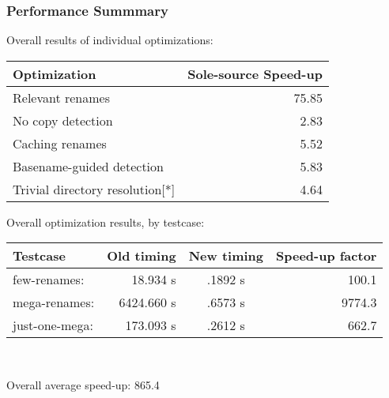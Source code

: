 \documentclass[compress,t]{beamer}
\begin{document}
\begin{frame}
  \frametitle{Performance Summmary}

  \vspace*{-0.2\baselineskip}
  Overall results of individual optimizations:\\
  \pause
  \vspace*{0.4\baselineskip}
  \qquad
  \begin{tabular}{l|r}%
    Optimization
      & \multicolumn{1}{p{5.5em}}{\centering Sole-source Speed-up}
      \\
    \hline
    Relevant renames                & 75.85\hspace*{1.4em}
                                    \\
    No copy detection               &  2.83\hspace*{1.4em}
                                    \\
    Caching renames                 &  5.52\hspace*{1.4em}
                                    \\
    Basename-guided detection       &  5.83\hspace*{1.4em}
                                    \\
    Trivial directory resolution[*] &  4.64\hspace*{1.4em}
  \end{tabular}

  \pause
  \vspace*{0.4\baselineskip}
  Overall optimization results, by testcase:\\
  \vspace*{0.4\baselineskip}
  \qquad
  \begin{tabular}{l|r|c|r}
    Testcase       & \multicolumn{1}{c|}{Old timing}
                   & \multicolumn{1}{c|}{New timing}
                   & \multicolumn{1}{p{4.4em}}{\centering Speed-up factor} \\
    \hline
    few-renames:   &   18.934 s & .1892 s &  100.1 \hspace*{0.3em} \\
    mega-renames:  & 6424.660 s & .6573 s & 9774.3 \hspace*{0.3em} \\
    just-one-mega: &  173.093 s & .2612 s &  662.7 \hspace*{0.3em}
  \end{tabular}\\
  \begin{center}Overall average speed-up: 865.4\end{center}

\end{frame}
\end{document}
